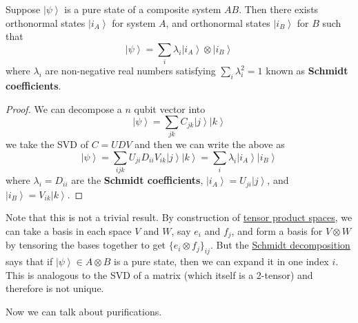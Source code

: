 \documentclass{article}
\newcommand{\ket}[1]{\ensuremath{\left|#1\right\rangle}}
\newcounter{theorem}[section]
\begin{document}
    \begin{theorem}
      \label{thm:schmidt-decomposition}
      Suppose $\ket{\psi}$ is a pure state of a composite system $AB$. Then there exists orthonormal states $\ket{i_A}$ for system $A$, and orthonormal states $\ket{i_B}$  for $B$ such that 
      \begin{equation}
        \ket{\psi} = \sum_i \lambda_i \ket{i_A} \otimes \ket{i_B}
      \end{equation}
      where $\lambda_i$ are non-negative real numbers satisfying $\sum_i \lambda_i^2 = 1$ known as \textbf{Schmidt coefficients}.
    \end{theorem}
    \begin{proof}
      We can decompose a $n$ qubit vector into 
      \begin{equation}
        \ket{\psi} = \sum_{j k} C_{j k} \ket{j} \ket{k} 
      \end{equation}
      we take the SVD of $C = U D V$ and then we can write the above as 
      \begin{equation}
        \ket{\psi} = \sum_{i j k} U_{ji} D_{ii} V_{ik} \ket{j} \ket{k} = \sum_i \lambda_i \ket{i_A} \ket{i_B} 
      \end{equation}
      where $\lambda_i = D_{ii}$ are the \textbf{Schmidt coefficients}, $\ket{i_A} = U_{j i} \ket{j}$, and $\ket{i_B} = V_{ik} \ket{k}$. 
    \end{proof}

    Note that this is not a trivial result. By construction of \hyperref[lin-def:tensor]{tensor product spaces}, we can take a basis in each space $V$ and $W$, say $e_i$ and $f_j$, and form a basis for $V \otimes W$ by tensoring the bases together to get $\{e_i \otimes f_j\}_{ij}$. But the \hyperref[thm:schmidt-decomposition]{Schmidt decomposition} says that if $\ket{\psi} \in A \otimes B$ is a pure state, then we can expand it in one index $i$. This is analogous to the SVD of a matrix (which itself is a 2-tensor) and therefore is not unique. 

    Now we can talk about purifications. 
\end{document}
